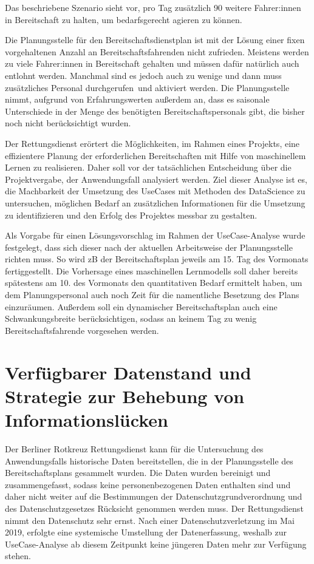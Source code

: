 Das beschriebene Szenario \citep{pak_aufgabenstellung_dlmdwme01_2024} sieht vor, pro Tag zusätzlich 90 weitere Fahrer:innen in Bereitschaft zu halten, um bedarfsgerecht agieren zu können.

Die Planungsstelle für den Bereitschaftsdienstplan ist mit der Lösung einer fixen vorgehaltenen Anzahl an Bereitschaftsfahrenden nicht zufrieden. Meistens werden zu viele Fahrer:innen in Bereitschaft gehalten und müssen dafür natürlich auch entlohnt werden. Manchmal sind es jedoch auch zu wenige und dann muss zusätzliches Personal \glqq durchgerufen\grqq\ und aktiviert werden. Die Planungsstelle nimmt, aufgrund von Erfahrungswerten außerdem an, dass es saisonale Unterschiede in der Menge des benötigten Bereitschaftspersonals gibt, die bisher noch nicht berücksichtigt wurden.

Der Rettungsdienst erörtert die Möglichkeiten, im Rahmen eines Projekts, eine effizientere Planung der erforderlichen Bereitschaften mit Hilfe von maschinellem Lernen zu realisieren. Daher soll vor der tatsächlichen Entscheidung über die Projektvergabe, der Anwendungsfall analysiert werden. Ziel dieser Analyse ist es, die Machbarkeit der Umsetzung des UseCases mit Methoden des DataScience zu untersuchen, möglichen Bedarf an zusätzlichen Informationen für die Umsetzung zu identifizieren und den Erfolg des Projektes messbar zu gestalten. 

Als Vorgabe für einen Lösungsvorschlag im Rahmen der UseCase-Analyse wurde festgelegt, dass sich dieser nach der aktuellen Arbeitsweise der Planungsstelle richten muss. So wird zB der Bereitschaftsplan jeweils am 15. Tag des Vormonats fertiggestellt. Die Vorhersage eines maschinellen Lernmodells soll daher bereits spätestens am 10. des Vormonats den quantitativen Bedarf ermittelt haben, um dem Planungspersonal auch noch Zeit für die namentliche Besetzung des Plans einzuräumen. Außerdem soll ein dynamischer Bereitschaftsplan auch eine Schwankungsbreite berücksichtigen, sodass an keinem Tag zu wenig Bereitschaftsfahrende vorgesehen werden.


\section{Verfügbarer Datenstand und Strategie zur Behebung von Informationslücken}
\label{datenstand}

Der Berliner Rotkreuz Rettungsdienst kann für die Untersuchung des Anwendungsfalls historische Daten bereitstellen, die in der Planungsstelle des Bereitschaftsplans gesammelt wurden. Die Daten wurden bereinigt und zusammengefasst, sodass keine personenbezogenen Daten enthalten sind und daher nicht weiter auf die Bestimmungen der Datenschutzgrundverordnung und des Datenschutzgesetzes Rücksicht genommen werden muss. Der Rettungsdienst nimmt den Datenschutz sehr ernst. Nach einer Datenschutzverletzung im Mai 2019, erfolgte eine systemische Umstellung der Datenerfassung, weshalb zur UseCase-Analyse ab diesem Zeitpunkt keine jüngeren Daten  mehr zur Verfügung stehen.

